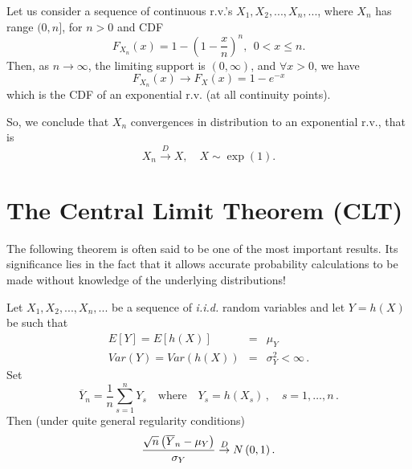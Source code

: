 \documentclass[notes=show,smaller,handout]{beamer}\usepackage[]{graphicx}\usepackage[]{color}
\begin{document}
\begin{frame}{\secname}
  \begin{example}
  \begin{footnotesize}
  Let us consider a sequence of continuous r.v.'s $X_1, X_2, ..., X_n,...$, where $X_n$ has range $(0, n]$, for $n > 0$ and CDF
  $$
  F_{X_n} (x) = 1- \left( 1- \frac{x}{n} \right)^n,  \ \ 0<x\leq n.
  $$
  Then, as $n \to \infty$, the limiting support is $(0,\infty)$, and $\forall x >0$, we have
  $$
  F_{X_n} (x)  \to F_X(x) = 1 - e^{-x}
  $$
  which is the CDF of an exponential r.v. (at all continuity points). \vspace{0.5cm}

  So, we conclude that $X_n$ convergences in distribution to an exponential r.v., that is
  $$
  X_n \overset{D}{\rightarrow } X, \quad X \sim \exp(1).
  $$
  \end{footnotesize}
  \end{example}
\end{frame}

\section{The Central Limit Theorem (CLT)}

\begin{frame}{\secname}

  The following theorem is often said to be one of the most important results. Its significance lies in the fact that it allows accurate probability calculations to be made without knowledge of the underlying distributions!

  \begin{theorem} Let $X_{1},X_{2},...,X_{n},...$ be a sequence of \textit{i.i.d.} random variables and let $Y=h(X)$ be such that
  \begin{eqnarray*}
  E[Y]=E\left[ h(X)\right]  &=&\mu_Y  \\
  Var(Y)=Var\left( h(X)\right)  &=&\sigma_Y ^{2}<\infty\,.
  \end{eqnarray*}%
  Set
  $$
  \overline{Y}_n=\frac{1}{n}\sum_{s=1}^nY_s\quad\text{where}\quad Y_s=h(X_s)\,,\quad s=1,\ldots,n\,.
  $$
  Then (under quite general regularity conditions)%
  \begin{equation*}
  \frac{\sqrt{n}\left( \overline{Y}_{n}-\mu_Y \right) }{\sigma_Y }\overset{D}{%
  \rightarrow }N\left( 0,1\right).
  \end{equation*}
  \end{theorem}
\end{frame}
\end{document}

